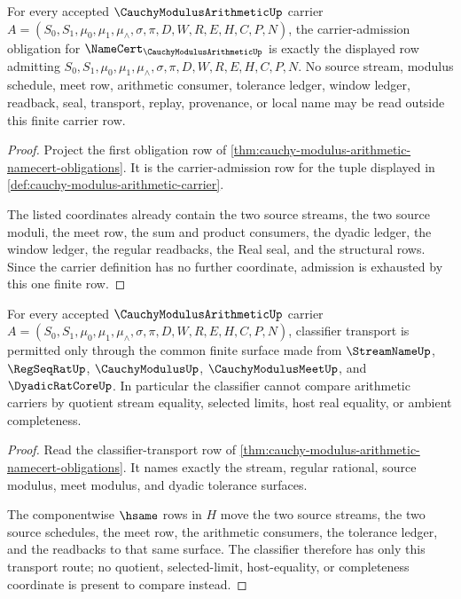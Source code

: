 \begin{theorem}
\label{thm:cauchy-modulus-arithmetic-namecert-obligation-carrier}
For every accepted $\CauchyModulusArithmeticUp$ carrier
$A=(S_0,S_1,\mu_0,\mu_1,\mu_{\wedge},\sigma,\pi,D,W,R,E,H,C,P,N)$, the
carrier-admission obligation for $\NameCert_{\CauchyModulusArithmeticUp}$ is
exactly the displayed row admitting $S_0,S_1,\mu_0,\mu_1,\mu_{\wedge},\sigma,
\pi,D,W,R,E,H,C,P,N$. No source stream, modulus schedule, meet row, arithmetic
consumer, tolerance ledger, window ledger, readback, seal, transport, replay,
provenance, or local name may be read outside this finite carrier row.
\end{theorem}
\begin{proof}
Project the first obligation row of
\autoref{thm:cauchy-modulus-arithmetic-namecert-obligations}. It is the
carrier-admission row for the tuple displayed in
\autoref{def:cauchy-modulus-arithmetic-carrier}.

The listed coordinates already contain the two source streams, the two source
moduli, the meet row, the sum and product consumers, the dyadic ledger, the
window ledger, the regular readbacks, the Real seal, and the structural rows.
Since the carrier definition has no further coordinate, admission is exhausted
by this one finite row.
\end{proof}

\begin{theorem}
\label{thm:cauchy-modulus-arithmetic-namecert-obligation-classifier}
For every accepted $\CauchyModulusArithmeticUp$ carrier
$A=(S_0,S_1,\mu_0,\mu_1,\mu_{\wedge},\sigma,\pi,D,W,R,E,H,C,P,N)$, classifier
transport is permitted only through the common finite surface made from
$\StreamNameUp$, $\RegSeqRatUp$, $\CauchyModulusUp$,
$\CauchyModulusMeetUp$, and $\DyadicRatCoreUp$. In particular the classifier
cannot compare arithmetic carriers by quotient stream equality, selected
limits, host real equality, or ambient completeness.
\end{theorem}
\begin{proof}
Read the classifier-transport row of
\autoref{thm:cauchy-modulus-arithmetic-namecert-obligations}. It names exactly
the stream, regular rational, source modulus, meet modulus, and dyadic
tolerance surfaces.

The componentwise $\hsame$ rows in $H$ move the two source streams, the two
source schedules, the meet row, the arithmetic consumers, the tolerance ledger,
and the readbacks to that same surface. The classifier therefore has only this
transport route; no quotient, selected-limit, host-equality, or completeness
coordinate is present to compare instead.
\end{proof}

